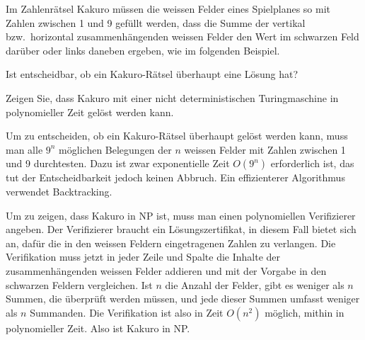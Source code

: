 Im Zahlenrätsel Kakuro müssen die weissen Felder eines Spielplanes
so mit Zahlen zwischen 1 und 9 gefüllt werden, dass die Summe der
vertikal bzw.~horizontal zusammenhängenden weissen Felder den Wert im
schwarzen Feld darüber oder links daneben ergeben, wie im folgenden
Beispiel. 
\begin{center}
\end{center}
\begin{teilaufgaben}
\item 
Ist entscheidbar, ob ein Kakuro-Rätsel überhaupt eine Lösung
hat?
\item
Zeigen Sie, dass Kakuro mit einer nicht deterministischen Turingmaschine
in polynomieller Zeit gelöst werden kann.
\end{teilaufgaben}


\begin{loesung}
\begin{teilaufgaben}
\item
Um zu entscheiden, ob ein Kakuro-Rätsel überhaupt gelöst werden
kann, muss man alle $9^n$ möglichen Belegungen der $n$ weissen
Felder mit Zahlen zwischen 1 und 9 durchtesten. Dazu ist zwar
exponentielle Zeit $O(9^n)$ erforderlich ist, das tut der Entscheidbarkeit
jedoch keinen Abbruch.
Ein effizienterer Algorithmus verwendet Backtracking.
\item
Um zu zeigen, dass Kakuro in NP ist, muss man einen polynomiellen
Verifizierer angeben. Der Verifizierer braucht ein Lösungszertifikat,
in diesem Fall bietet sich an, dafür die in den weissen Feldern eingetragenen
Zahlen zu verlangen. Die Verifikation muss jetzt in jeder Zeile und
Spalte die Inhalte der zusammenhängenden weissen Felder addieren und 
mit der Vorgabe in den schwarzen Feldern vergleichen. Ist $n$ die Anzahl
der Felder, gibt es weniger als $n$ Summen, die überprüft werden müssen,
und jede dieser Summen umfasst weniger als $n$ Summanden. Die Verifikation
ist also in Zeit $O(n^2)$ möglich, mithin in polynomieller Zeit.
Also ist Kakuro in NP.
\qedhere
\end{teilaufgaben}
\end{loesung}
